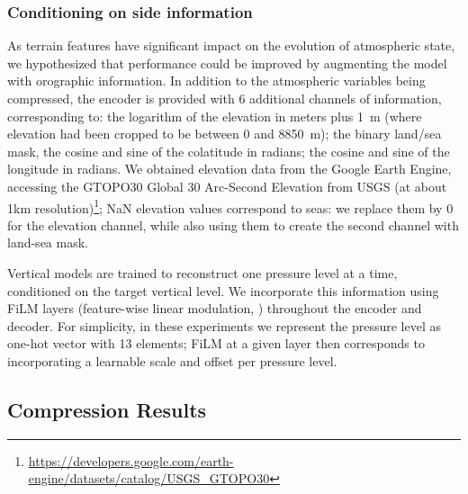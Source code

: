 \subsubsection{Conditioning on side information}

As terrain features have significant impact on the evolution of atmospheric state, we hypothesized that performance could be improved by augmenting the model with orographic information.
In addition to the atmospheric variables being compressed, the encoder is provided with 6 additional channels of information, corresponding to: the logarithm of the elevation in meters plus 1~m (where elevation had been cropped to be between 0 and 8850~m); the binary land/sea mask, the cosine and sine of the colatitude in radians; the cosine and sine of the longitude in radians. We obtained elevation data from the Google Earth Engine, accessing the GTOPO30 Global 30 Arc-Second Elevation from USGS (at about 1km resolution)\footnote{\url{https://developers.google.com/earth-engine/datasets/catalog/USGS_GTOPO30}}; NaN elevation values correspond to seas: we replace them by 0 for the elevation channel, while also using them to create the second channel with land-sea mask.

Vertical models are trained to reconstruct one pressure level at a time, conditioned on the target vertical level.
We incorporate this information using FiLM layers (feature-wise linear modulation, \citet{perez2018film}) throughout the encoder and decoder.
For simplicity, in these experiments we represent the pressure level as one-hot vector with 13 elements; FiLM at a given layer then corresponds to incorporating a learnable scale and offset per pressure level.

\subsection{Compression Results}

